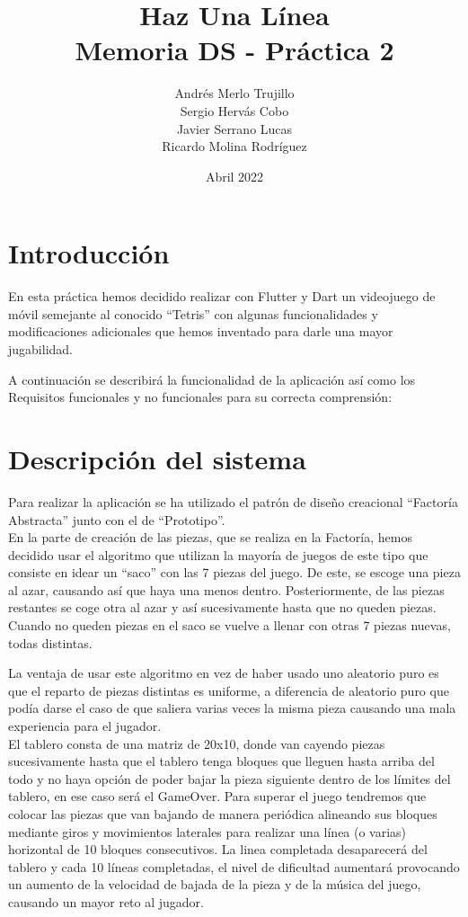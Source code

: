 \documentclass{article}
\title{Haz Una Línea\\
\large Memoria DS - Práctica 2}
\author{Andrés Merlo Trujillo\\ Sergio Hervás Cobo\\ Javier Serrano Lucas\\ Ricardo Molina Rodríguez}
\begin{document}
\date{Abril 2022}
\maketitle
\section{Introducción}
En esta práctica hemos decidido realizar con Flutter y Dart un videojuego de móvil
semejante al conocido ``Tetris'' con algunas funcionalidades y modificaciones adicionales
que hemos inventado para darle una mayor jugabilidad.

A continuación se describirá la funcionalidad de la aplicación así como los Requisitos
funcionales y no funcionales para su correcta comprensión:

\section{Descripción del sistema}
Para realizar la aplicación se ha utilizado el patrón de diseño creacional
 ``Factoría Abstracta'' junto con el de ``Prototipo''.\\

En la parte de creación de las piezas, que se realiza en la Factoría, hemos
 decidido usar el algoritmo que utilizan la mayoría de juegos de este tipo que
 consiste en idear un ``saco'' con las 7 piezas del juego. De este, se escoge una pieza al azar,
 causando así que haya una menos dentro. Posteriormente, de las piezas restantes se coge otra al azar
  y así sucesivamente hasta que no queden piezas. Cuando no queden piezas en el saco se vuelve
  a llenar con otras 7 piezas nuevas, todas distintas.

La ventaja de usar este algoritmo en vez de haber usado uno aleatorio puro es
 que el reparto de piezas distintas es uniforme, a diferencia de aleatorio puro
 que podía darse el caso de que saliera varias veces la misma pieza causando una
 mala experiencia para el jugador.\\

El tablero consta de una matriz de 20x10, donde van cayendo piezas sucesivamente
hasta que el tablero tenga bloques que lleguen hasta arriba del todo y no haya
opción de poder bajar la pieza siguiente dentro de los límites del tablero, en
ese caso será el GameOver. Para superar el juego tendremos que colocar
las piezas que van bajando de manera periódica alineando sus bloques mediante
giros y movimientos laterales para realizar una línea (o varias) horizontal de
10 bloques consecutivos. La linea completada desaparecerá del tablero y cada 10 líneas
completadas, el nivel de dificultad aumentará provocando un aumento de la velocidad de
bajada de la pieza y de la música del juego, causando un mayor reto al jugador.\\
\end{document}
